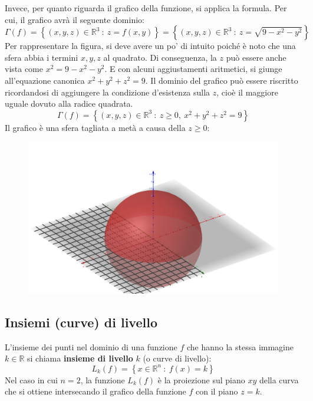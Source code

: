 \documentclass[a4paper]{article}
\newcommand{\definition}[1]{\textcolor{Red3}{\textbf{#1}}}
\begin{document}
	\noindent
	Invece, per quanto riguarda il grafico della funzione, si applica la formula. Per cui, il grafico avrà il seguente dominio:
	\begin{equation*}
		\Gamma\left(f\right) = \left\{\left(x,y,z\right) \in \mathbb{R}^{3} \: : \: z = f\left(x,y\right)\right\} = \left\{\left(x,y,z\right) \in \mathbb{R}^{3} \: : \: z = \sqrt{9 - x^{2} - y^{2}}\right\}
	\end{equation*}
	Per rappresentare la figura, si deve avere un po' di intuito poiché è noto che una sfera abbia i termini $x,y,z$ al quadrato. Di conseguenza, la $z$ può essere anche vista come $x^{2} = 9 - x^{2} - y^{2}$. E con alcuni aggiustamenti aritmetici, si giunge all'equazione canonica $x^{2} + y^{2} + z^{2} = 9$. Il dominio del grafico può essere riscritto ricordandosi di aggiungere la condizione d'esistenza sulla $z$, cioè il maggiore uguale dovuto alla radice quadrata.
	\begin{equation*}
		\Gamma\left(f\right) = \left\{\left(x,y,z\right) \in \mathbb{R}^{3} \: : \: z \ge 0, \: x^{2} + y^{2} + z^{2} = 9 \right\}
	\end{equation*}
	Il grafico è una sfera tagliata a metà a causa della $z \ge 0$:
	\begin{figure}[!htp]
		\centering
		\includegraphics[width=\textwidth]{img/grafico_di_una_funzione.png}
	\end{figure}\newpage

	\subsection{Insiemi (curve) di livello}\label{subsection: insiemi (curve) di livello}

	L'insieme dei punti nel dominio di una funzione $f$ che hanno la stessa immagine $k \in \mathbb{R}$ si chiama \definition{insieme di livello} $k$ (o curve di livello):
	\begin{equation}\label{eq: curve di livello}
		L_{k}\left(f\right) = \left\{x \in \mathbb{R}^{n} \: : \: f\left(x\right) = k\right\}
	\end{equation}
	Nel caso in cui $n = 2$, la funzione $L_{k}\left(f\right)$ è la proiezione sul piano $xy$ della curva che si ottiene intersecando il grafico della funzione $f$ con il piano $z = k$.\newline
\end{document}
